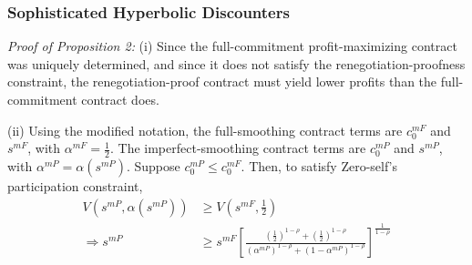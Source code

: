 \documentclass[11pt,english]{article}
\theoremstyle{plain}
\theoremstyle{definition}
\begin{document}
\subsubsection{Sophisticated Hyperbolic Discounters}

\textit{Proof of Proposition 2:} (i) Since the full-commitment
profit-maximizing contract was uniquely determined, and since it does
not satisfy the renegotiation-proofness constraint, the renegotiation-proof
contract must yield lower profits than the full-commitment contract
does.

(ii) Using the modified notation, the full-smoothing contract terms
are $c_{0}^{mF}$ and $s^{mF}$, with $\alpha^{mF}=\frac{1}{2}$.
The imperfect-smoothing contract terms are $c_{0}^{mP}$ and $s^{mP}$,
with $\alpha^{mP}=\alpha\left(s^{mP}\right)$. Suppose $c_{0}^{mP}\leq c_{0}^{mF}$.
Then, to satisfy Zero-self's participation constraint,
\begin{align}
V\left(s^{mP},\alpha\left(s^{mP}\right)\right) & \geq V\left(s^{mF},\frac{1}{2}\right)\\
\Rightarrow s^{mP} & \geq s^{mF}\left[\frac{\left(\frac{1}{2}\right)^{1-\rho}+\left(\frac{1}{2}\right)^{1-\rho}}{\left(\alpha^{mP}\right)^{1-\rho}+\left(1-\alpha^{mP}\right)^{1-\rho}}\right]^{\frac{1}{1-\rho}}\label{eq:s-compare}
\end{align}
\end{document}
